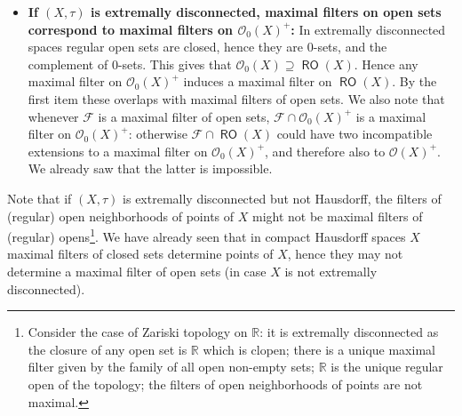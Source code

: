 \documentclass[11pt]{amsart}
\newcommand{\F}{\mathcal{F}}
\newcommand{\G}{\mathcal{G}}
\theoremstyle{plain}
\theoremstyle{definition}
\theoremstyle{plain}
\theoremstyle{remark}
\DeclareMathOperator{\RO}{\mathsf{RO}}
\newcommand{\bp}[1]{\left\lbrace #1 \right\rbrace}
\newcommand{\0}{\mathsf{0}}
\renewcommand{\1}{\mathsf{1}}
\renewcommand{\2}{\mathsf{2}}
\theoremstyle{definition}
\begin{document}
\begin{itemize}
Conversely if $\G$ is a maximal filter of $0$-sets, $\bigcap\G$ is a singleton $\bp{x_\G}$
(we use here that the space is compact Hausdorff).
Therefore $\G^*$ is the intersection with the $0$-sets
of the maximal filter of closed sets given by closed sets containing $x_\G$.
Hence we have a bijective correspondence between maximal filters of closed sets and maximal filters of $0$-sets.
%
\item\textbf{If $(X,\tau)$ is extremally disconnected, maximal filters on open sets correspond to maximal filters on $\mathcal{O}_0(X)^+$:} 
In extremally disconnected spaces regular open sets are closed, hence they are $0$-sets, and the complement of $0$-sets. This gives that $\mathcal{O}_0(X)\supseteq\RO(X)$. Hence any maximal filter on $\mathcal{O}_0(X)^+$ induces a maximal filter on $\RO(X)$. 
By the first item these overlaps with maximal filters of open sets.
We also note that whenever $\F$ is a maximal filter of open sets, $\F\cap \mathcal{O}_0(X)^+$ is a
maximal filter on $\mathcal{O}_0(X)^+$: otherwise $\F\cap \RO(X)$ could have two incompatible extensions to a maximal filter on $\mathcal{O}_0(X)^+$, and therefore also to $\mathcal{O}(X)^+$. We already saw that the latter is impossible.
\end{itemize}
Note that if $(X,\tau)$ is extremally disconnected but not Hausdorff, the filters of (regular) open neighborhoods of points of $X$ might not be maximal filters of (regular) opens\footnote{Consider the case of Zariski topology on $\mathbb{R}$: it is extremally disconnected as the closure of any open set is $\mathbb{R}$ which is clopen; there is a unique maximal filter given by the family of all open non-empty sets; $\mathbb{R}$ is the unique regular open of the topology; the filters of open neighborhoods of points are not maximal.}. We have already seen that in compact Hausdorff spaces $X$ maximal filters of closed sets determine points of $X$, hence they may not determine a maximal filter of open sets (in case $X$ is not extremally disconnected).
\end{document}
